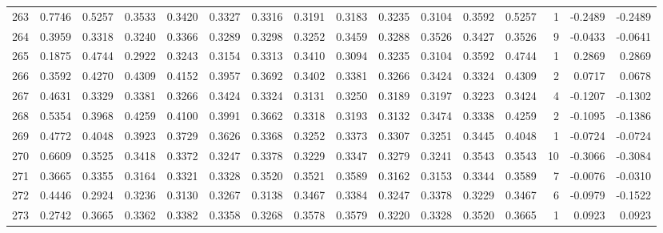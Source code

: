 \begin{tabular}{lrrrrrrrrrrrrrrr}
263 &      0.7746 &  0.5257 &  0.3533 &  0.3420 &  0.3327 &  0.3316 &  0.3191 &  0.3183 &  0.3235 &  0.3104 &   0.3592 &     0.5257 &      1 &                   -0.2489 &                    -0.2489 \\
264 &      0.3959 &  0.3318 &  0.3240 &  0.3366 &  0.3289 &  0.3298 &  0.3252 &  0.3459 &  0.3288 &  0.3526 &   0.3427 &     0.3526 &      9 &                   -0.0433 &                    -0.0641 \\
265 &      0.1875 &  0.4744 &  0.2922 &  0.3243 &  0.3154 &  0.3313 &  0.3410 &  0.3094 &  0.3235 &  0.3104 &   0.3592 &     0.4744 &      1 &                    0.2869 &                     0.2869 \\
266 &      0.3592 &  0.4270 &  0.4309 &  0.4152 &  0.3957 &  0.3692 &  0.3402 &  0.3381 &  0.3266 &  0.3424 &   0.3324 &     0.4309 &      2 &                    0.0717 &                     0.0678 \\
267 &      0.4631 &  0.3329 &  0.3381 &  0.3266 &  0.3424 &  0.3324 &  0.3131 &  0.3250 &  0.3189 &  0.3197 &   0.3223 &     0.3424 &      4 &                   -0.1207 &                    -0.1302 \\
268 &      0.5354 &  0.3968 &  0.4259 &  0.4100 &  0.3991 &  0.3662 &  0.3318 &  0.3193 &  0.3132 &  0.3474 &   0.3338 &     0.4259 &      2 &                   -0.1095 &                    -0.1386 \\
269 &      0.4772 &  0.4048 &  0.3923 &  0.3729 &  0.3626 &  0.3368 &  0.3252 &  0.3373 &  0.3307 &  0.3251 &   0.3445 &     0.4048 &      1 &                   -0.0724 &                    -0.0724 \\
270 &      0.6609 &  0.3525 &  0.3418 &  0.3372 &  0.3247 &  0.3378 &  0.3229 &  0.3347 &  0.3279 &  0.3241 &   0.3543 &     0.3543 &     10 &                   -0.3066 &                    -0.3084 \\
271 &      0.3665 &  0.3355 &  0.3164 &  0.3321 &  0.3328 &  0.3520 &  0.3521 &  0.3589 &  0.3162 &  0.3153 &   0.3344 &     0.3589 &      7 &                   -0.0076 &                    -0.0310 \\
272 &      0.4446 &  0.2924 &  0.3236 &  0.3130 &  0.3267 &  0.3138 &  0.3467 &  0.3384 &  0.3247 &  0.3378 &   0.3229 &     0.3467 &      6 &                   -0.0979 &                    -0.1522 \\
273 &      0.2742 &  0.3665 &  0.3362 &  0.3382 &  0.3358 &  0.3268 &  0.3578 &  0.3579 &  0.3220 &  0.3328 &   0.3520 &     0.3665 &      1 &                    0.0923 &                     0.0923 \\

\end{tabular}

